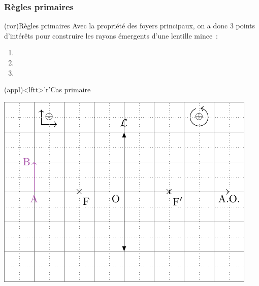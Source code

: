 \documentclass[../../main/main.tex]{subfiles}
\begin{document}
\subsubsection{Règles primaires}

\begin{tcbraster}[raster columns=2, raster equal height=rows]
	\begin{tcb*}[label=impo:lent_regles](ror){Règles primaires}
		Avec la propriété des foyers principaux, on a donc 3 points d'intérêts
		pour construire les rayons émergents d'une lentille mince~:
		\begin{enumerate}
			\item {}
			\item {}
			\item {}
		\end{enumerate}
	\end{tcb*}
	\begin{tcb*}[label=appl:constru](appl)<lftt>'r'{Cas primaire}
		\begin{center}
			\includegraphics[width=\linewidth]{lent_conv-constru_simple-plain}
			\label{fig:convconstrusimple}
		\end{center}
	\end{tcb*}
\end{tcbraster}
\end{document}

